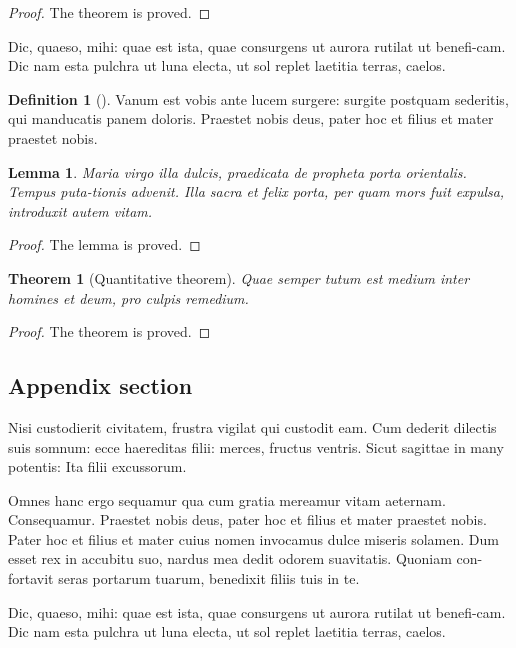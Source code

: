 \documentclass[numbers,compress]{vmsta}
\newtheorem{thm}{Theorem}
\newtheorem{lemma}{Lemma}
\theoremstyle{definition}
\newtheorem{defin}{Definition}
\begin{document}
\begin{proof}
The theorem is proved.
\end{proof}

Dic, quaeso, mihi: quae est ista, quae consurgens ut aurora rutilat
ut benefi-cam.  Dic nam esta pulchra ut luna electa, ut sol replet
laetitia terras, caelos.

\begin{defin}[\cite{powergrid1}]\label{clas}
Vanum est vobis ante lucem surgere: surgite postquam
sederitis, qui manducatis panem doloris. Praestet nobis deus, pater
hoc et filius et mater praestet nobis.
\end{defin}

\begin{lemma}
Maria virgo illa dulcis, praedicata de
propheta porta orientalis. Tempus puta-tionis advenit. Illa sacra et
felix porta, per quam mors fuit expulsa, introduxit autem vitam.
\end{lemma}

\begin{proof}
The lemma is proved.
\end{proof}

\begin{thm}[Quantitative theorem]
Quae semper tutum est medium inter homines et deum, pro culpis remedium.
\end{thm}

\begin{proof}
The theorem is proved.
\end{proof}


\begin{appendix}

\section{Appendix section}

Nisi custodierit civitatem,
frustra vigilat qui custodit eam. Cum dederit dilectis suis somnum:
ecce haereditas filii: merces, fructus ventris. Sicut sagittae in
many potentis: Ita filii excussorum.

\end{appendix}

\begin{acknowledgement}[title={Acknowledgments}]
Omnes hanc ergo sequamur qua cum gratia mereamur vitam aeternam.
Consequamur. Praestet nobis deus, pater hoc et filius et mater
praestet nobis.  Pater hoc et filius et mater cuius nomen invocamus
dulce miseris solamen. Dum esset rex in accubitu suo, nardus mea
dedit odorem suavitatis. Quoniam con-fortavit seras portarum tuarum,
benedixit filiis tuis in te.
\end{acknowledgement}

\begin{funding}
Dic, quaeso, mihi: quae est ista, quae consurgens ut aurora rutilat
ut benefi-cam.  Dic nam esta pulchra ut luna electa, ut sol replet
laetitia terras, caelos.
\end{funding}



\end{document}
